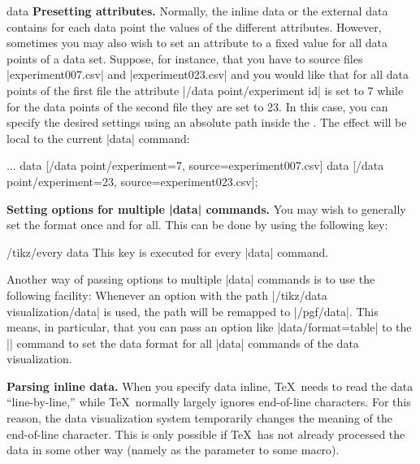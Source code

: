 \begin{datavisualizationoperation}{data}{}
  \medskip
  \textbf{Presetting attributes.}
  Normally, the inline data or the external data contains for each
  data point the values of the different attributes. However,
  sometimes you may also wish to set an attribute to a fixed value for
  all data points of a data set. Suppose, for instance, that you have
  to source files |experiment007.csv| and |experiment023.csv| and you
  would like that for all data points of the first file the attribute
  |/data point/experiment id| is set to 7 while for the data points of
  the second file they are set to 23. In this case, you can specify
  the desired settings using an absolute path inside the
  . The effect will be local to the current |data|
  command:
\begin{codeexample}
\datavisualization...
  data [/data point/experiment=7,  source=experiment007.csv]
  data [/data point/experiment=23, source=experiment023.csv];
\end{codeexample}
  
  \begin{codeexample}[]
\end{codeexample}

  \medskip
  \textbf{Setting options for multiple |data| commands.}
  You may wish to generally set the format once and for all. This can
  be done by using the following key: 
  \begin{stylekey}{/tikz/every data}
    This key is executed for every |data| command.
  \end{stylekey}

  Another way of passing options to multiple |data| commands is to use
  the following facility: Whenever an option with the path
  |/tikz/data visualization/data| is used, the path will be remapped
  to  |/pgf/data|. This means, in particular, that you can pass an
  option like |data/format=table| to the |\datavisualization| command
  to set the data format for all |data| commands of the data
  visualization. 
  
  \medskip
  \textbf{Parsing inline data.}
  When you specify data inline, \TeX\ needs to read the data
  ``line-by-line,'' while \TeX\ normally largely ignores end-of-line
  characters. For this reason, the data visualization system
  temporarily changes the meaning of the end-of-line character. This
  is only possible if \TeX\ has not already processed the data in some 
  other way (namely as the parameter to some macro).


\end{datavisualizationoperation}
